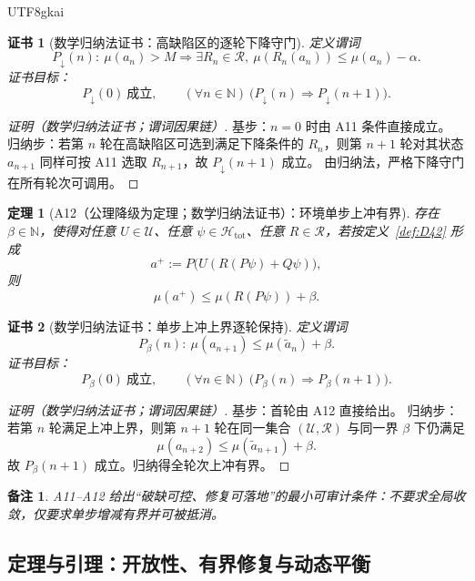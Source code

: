 \documentclass[12pt]{article}
\newtheorem{theorem}{定理}[section]
\newtheorem{remark}{备注}[section]
\newtheorem{Certificate}{证书}[section]
\begin{document}
\begin{CJK*}{UTF8}{gkai}
\begin{Certificate}[数学归纳法证书：高缺陷区的逐轮下降守门]
\label{cert:A11}
定义谓词
\[
P_{\downarrow}(n):\ \mu(a_n)>M\Rightarrow \exists R_n\in\mathcal R,\ \mu(R_n(a_n))\le \mu(a_n)-\alpha.
\]
证书目标：
\[
P_{\downarrow}(0)\ \text{成立},\qquad (\forall n\in\mathbb N)\ \bigl(P_{\downarrow}(n)\Rightarrow P_{\downarrow}(n+1)\bigr)
  .
\]
\end{Certificate}

\begin{proof}[证明（数学归纳法证书；谓词因果链）]
基步：$n=0$ 时由 A11 条件直接成立。
归纳步：若第 $n$ 轮在高缺陷区可选到满足下降条件的 $R_n$，则第 $n+1$ 轮对其状态 $a_{n+1}$ 同样可按 A11 选取 $R_{n+1}$，故 $P_{\downarrow}(n+1)$ 成立。
由归纳法，严格下降守门在所有轮次可调用。
\end{proof}

\begin{theorem}[A12（公理降级为定理；数学归纳法证书）：环境单步上冲有界]
\label{thm:A12}
存在 $\beta\in\mathbb N$，使得对任意 $U\in\mathcal U$、任意 $\psi\in\mathcal H_{\mathrm{tot}}$、任意 $R\in\mathcal R$，若按定义~\ref{def:D42} 形成
\[
a^+:=P\big(U(R(P\psi)+Q\psi)\big),
\]
则
\[
\mu(a^+)\le \mu(R(P\psi))+\beta.
\]
\end{theorem}

\begin{Certificate}[数学归纳法证书：单步上冲上界逐轮保持]
\label{cert:A12}
定义谓词
\[
P_{\beta}(n):\ \mu(a_{n+1})\le \mu(\tilde a_n)+\beta.
\]
证书目标：
\[
P_{\beta}(0)\ \text{成立},\qquad (\forall n\in\mathbb N)\ \bigl(P_{\beta}(n)\Rightarrow P_{\beta}(n+1)\bigr).
\]
\end{Certificate}

\begin{proof}[证明（数学归纳法证书；谓词因果链）]
基步：首轮由 A12 直接给出。
归纳步：若第 $n$ 轮满足上冲上界，则第 $n+1$ 轮在同一集合 $(\mathcal U,\mathcal R)$ 与同一界 $\beta$ 下仍满足
\[
\mu(a_{n+2})\le \mu(\tilde a_{n+1})+\beta.
\]
故 $P_{\beta}(n+1)$ 成立。归纳得全轮次上冲有界。
\end{proof}

\begin{remark}
A11--A12 给出“破缺可控、修复可落地”的最小可审计条件：不要求全局收敛，仅要求单步增减有界并可被抵消。
\end{remark}

\subsection{定理与引理：开放性、有界修复与动态平衡}


\end{CJK*}
\end{document}
